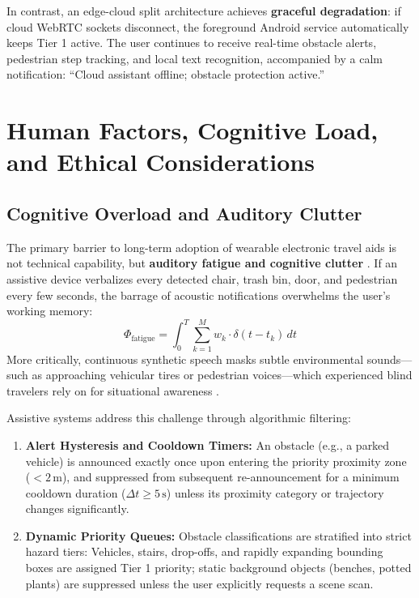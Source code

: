 \documentclass[10pt,twocolumn]{article}
\begin{document}
In contrast, an edge-cloud split architecture achieves \textbf{graceful degradation}: if cloud WebRTC sockets disconnect, the foreground Android service automatically keeps Tier 1 active. The user continues to receive real-time obstacle alerts, pedestrian step tracking, and local text recognition, accompanied by a calm notification: ``Cloud assistant offline; obstacle protection active.''

\section{Human Factors, Cognitive Load, and Ethical Considerations}
\label{sec:hci_privacy}

\subsection{Cognitive Overload and Auditory Clutter}
The primary barrier to long-term adoption of wearable electronic travel aids is not technical capability, but \textbf{auditory fatigue and cognitive clutter} \cite{roentgen2008inventory}. If an assistive device verbalizes every detected chair, trash bin, door, and pedestrian every few seconds, the barrage of acoustic notifications overwhelms the user's working memory:
\begin{equation}
    \Phi_{\text{fatigue}} = \int_0^T \sum_{k=1}^{M} w_k \cdot \delta(t - t_k) \, dt
\end{equation}
More critically, continuous synthetic speech masks subtle environmental sounds---such as approaching vehicular tires or pedestrian voices---which experienced blind travelers rely on for situational awareness \cite{ashmead1998spatial}.

Assistive systems address this challenge through algorithmic filtering:
\begin{enumerate}[leftmargin=*]
    \item \textbf{Alert Hysteresis and Cooldown Timers:} An obstacle (e.g., a parked vehicle) is announced exactly once upon entering the priority proximity zone ($<2\,\text{m}$), and suppressed from subsequent re-announcement for a minimum cooldown duration ($\Delta t \ge 5\,\text{s}$) unless its proximity category or trajectory changes significantly.
    \item \textbf{Dynamic Priority Queues:} Obstacle classifications are stratified into strict hazard tiers: Vehicles, stairs, drop-offs, and rapidly expanding bounding boxes are assigned Tier 1 priority; static background objects (benches, potted plants) are suppressed unless the user explicitly requests a scene scan.
\end{enumerate}
\end{document}
